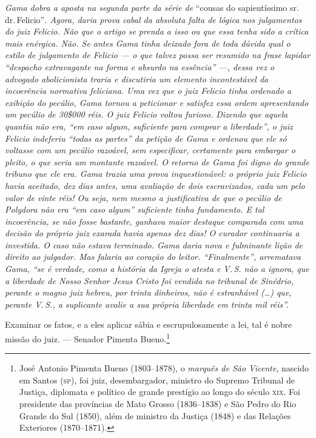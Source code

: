 \begin{didascalia}
\emph{Gama dobra a aposta na segunda parte da série de} ``cousas do
sapientíssimo sr.\,dr.\,Felicio''\emph{. Agora, daria prova cabal da
absoluta falta de lógica nos julgamentos do juiz Felicio. Não que o
artigo se prenda a isso ou que essa tenha sido a crítica mais enérgica.
Não. Se antes Gama tinha deixado fora de toda dúvida qual o estilo de
julgamento de Felicio --- o que talvez possa ser resumido na frase
lapidar ``despacho extravagante na forma e absurdo na essência'' ---, dessa
vez o advogado abolicionista traria e discutiria um elemento
incontestável da incoerência normativa feliciana. Uma vez que o juiz
Felicio tinha ordenado a exibição do pecúlio, Gama tornou a peticionar e
satisfez essa ordem apresentando um pecúlio de 30\$000 réis. O juiz
Felicio voltou furioso. Dizendo que aquela quantia não era, ``em caso
algum, suficiente para comprar a liberdade'', o juiz Felicio indeferiu
``todas as partes'' da petição de Gama e ordenou que ele só voltasse com
um pecúlio razoável, sem especificar, certamente para embargar o pleito,
o que seria um montante razoável. O retorno de Gama foi digno do grande
tribuno que ele era. Gama trazia uma prova inquestionável: o próprio
juiz Felicio havia aceitado, dez dias antes, uma avaliação de dois
escravizados, cada um pelo valor de vinte réis! Ou seja, nem mesmo a
justificativa de que o pecúlio de Polydora não era ``em caso algum''
suficiente tinha fundamento. E tal incoerência, se não fosse bastante,
ganhava maior destaque comparada com uma decisão do próprio juiz exarada
havia apenas dez dias! O curador continuaria a investida. O caso não
estava terminado. Gama daria nova e fulminante lição de direito ao
julgador. Mas falaria ao coração do leitor. ``Finalmente'', arrematava
Gama, ``se é verdade, como a história da Igreja o atesta e V.\,S. não a
ignora, que a liberdade de Nosso Senhor Jesus Cristo foi vendida no
tribunal de Sinédrio, perante o magno juiz hebreu, por trinta dinheiros,
não é estranhável (\ldots{}) que, perante V.\,S., a suplicante avalie a sua
própria liberdade em trinta mil réis''.}
\end{didascalia}


Examinar os fatos, e a eles aplicar sábia e escrupulosamente a lei, tal
é nobre missão do juiz. --- Senador Pimenta Bueno.\footnote{ José
  Antonio Pimenta Bueno (1803--1878), o \emph{marquês de São Vicente},
  nascido em Santos (\textsc{sp}), foi juiz, desembargador, ministro do Supremo
  Tribunal de Justiça, diplomata e político de grande prestígio ao longo
  do século \textsc{xix}. Foi presidente das províncias de Mato Grosso
  (1836--1838) e São Pedro do Rio Grande do Sul (1850), além de ministro
  da Justiça (1848) e das Relações Exteriores (1870--1871).}

